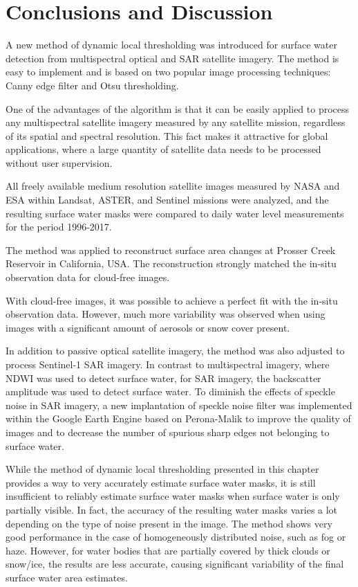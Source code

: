 \section{Conclusions and Discussion}

A new method of dynamic local thresholding was introduced for surface water detection from multispectral optical and SAR satellite imagery. The method is easy to implement and is based on two popular image processing techniques: Canny edge filter and Otsu thresholding. 

One of the advantages of the algorithm is that it can be easily applied to process any multispectral satellite imagery measured by any satellite mission, regardless of its spatial and spectral resolution. This fact makes it attractive for global applications, where a large quantity of satellite data needs to be processed without user supervision. 

All freely available medium resolution satellite images measured by NASA and ESA within Landsat, ASTER, and Sentinel missions were analyzed, and the resulting surface water masks were compared to daily water level measurements for the period 1996-2017.

The method was applied to reconstruct surface area changes at Prosser Creek Reservoir in California, USA. The reconstruction strongly matched the in-situ observation data for cloud-free images. 

With cloud-free images, it was possible to achieve a perfect fit with the in-situ observation data. However, much more variability was observed when using images with a significant amount of aerosols or snow cover present. 

In addition to passive optical satellite imagery, the method was also adjusted to process Sentinel-1 SAR imagery. In contrast to multispectral imagery, where NDWI was used to detect surface water, for SAR imagery, the backscatter amplitude was used to detect surface water. To diminish the effects of speckle noise in SAR imagery, a new implantation of speckle noise filter was implemented within the Google Earth Engine based on Perona-Malik to improve the quality of images and to decrease the number of spurious sharp edges not belonging to surface water. 

While the method of dynamic local thresholding presented in this chapter provides a way to very accurately estimate surface water masks, it is still insufficient to reliably estimate surface water masks when surface water is only partially visible. In fact, the accuracy of the resulting water masks varies a lot depending on the type of noise present in the image. The method shows very good performance in the case of homogeneously distributed noise, such as fog or haze. However, for water bodies that are partially covered by thick clouds or snow/ice, the results are less accurate, causing significant variability of the final surface water area estimates.


